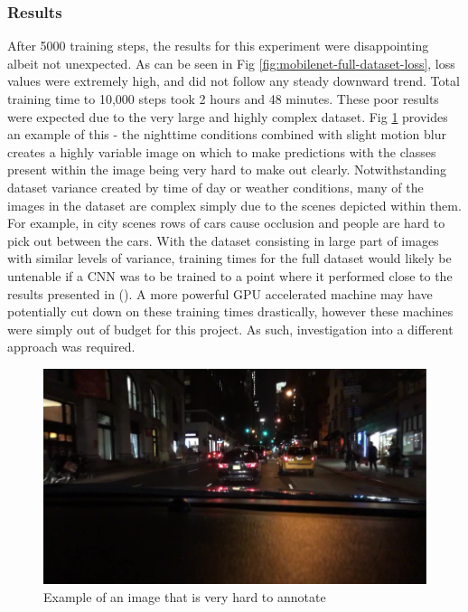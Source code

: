 \documentclass[12pt]{report}
\begin{document}
\subsubsection*{Results}
\begin{flushleft}
After 5000 training steps, the results for this experiment were disappointing albeit not unexpected. As can be seen in Fig \ref{fig:mobilenet-full-dataset-loss}, loss values were extremely high, and did not follow any steady downward trend. Total training time to 10,000 steps took 2 hours and 48 minutes. These poor results were expected due to the very large and highly complex dataset. Fig \ref{fig:noisy} provides an example of this - the nighttime conditions combined with slight motion blur creates a highly variable image on which to make predictions with the classes present within the image being very hard to make out clearly. Notwithstanding dataset variance created by time of day or weather conditions, many of the images in the dataset are complex simply due to the scenes depicted within them. For example, in city scenes rows of cars cause occlusion and people are hard to pick out between the cars. With the dataset consisting in large part of images with similar levels of variance, training times for the full dataset would likely be untenable if a CNN was to be trained to a point where it performed close to the results presented in (\cite{yu2018bdd100k}). A more powerful GPU accelerated machine may have potentially cut down on these training times drastically, however these machines were simply out of budget for this project. As such, investigation into a different approach was required.
\end{flushleft}

\vspace{0.5cm}
\begin{figure}[ht!]
	\centering
	\includegraphics[width=12cm]{noisy}
	\caption{Example of an image that is very hard to annotate}
	\label{fig:noisy}
\end{figure}
\end{document}
